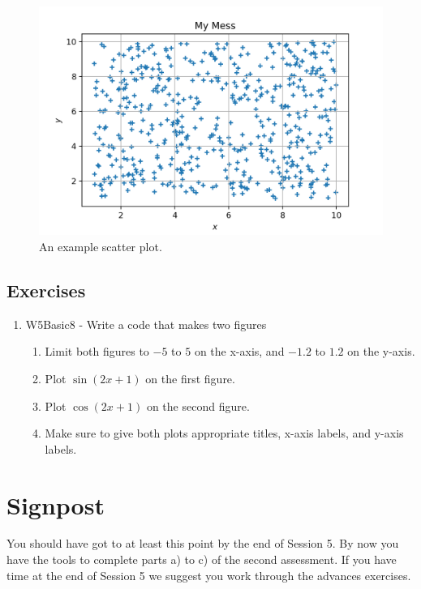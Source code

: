 \begin{figure}[H]
	\centering
	\includegraphics[width=\linewidth]{Figures/plotmess.png}
\caption{An example scatter plot.}
\label{fig:mess}
\end{figure}

\subsection{Exercises}

\begin{enumerate}
    \item W5Basic8 - Write a code that makes two figures
    \begin{enumerate}
        \item Limit both figures to $-5$ to $5$ on the x-axis, and $-1.2$ to $1.2$ on the y-axis.
        \item Plot $\sin(2x+1)$ on the first figure.
        \item Plot $\cos(2x+1)$ on the second figure.
        \item Make sure to give both plots appropriate titles, x-axis labels, and y-axis labels.
    \end{enumerate}
\end{enumerate}

\section{Signpost}

You should have got to at least this point by the end of Session 5. By now you have the tools to complete parts a) to c)  of the second assessment. If you have time at the end of Session 5 we suggest you work through the advances exercises.

